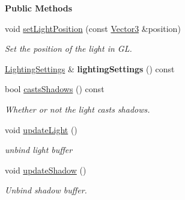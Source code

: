 \begin{Indent}\textbf{ Public Methods}\par
\begin{DoxyCompactItemize}
\item 
\mbox{\label{classrev_1_1_light_component_a3deb2d669f9bd58946af0c7efe9b61d1}} 
void \mbox{\hyperlink{classrev_1_1_light_component_a3deb2d669f9bd58946af0c7efe9b61d1}{set\+Light\+Position}} (const \mbox{\hyperlink{classrev_1_1_vector}{Vector3}} \&position)
\begin{DoxyCompactList}\small\item\em Set the position of the light in GL. \end{DoxyCompactList}\item 
\mbox{\label{classrev_1_1_light_component_a8dc576a02f274288436f8f10840ef3c2}} 
\mbox{\hyperlink{classrev_1_1_lighting_settings}{Lighting\+Settings}} \& {\bfseries lighting\+Settings} () const
\item 
\mbox{\label{classrev_1_1_light_component_a3933ce8d9e2c82e7f33f2bde7591f023}} 
bool \mbox{\hyperlink{classrev_1_1_light_component_a3933ce8d9e2c82e7f33f2bde7591f023}{casts\+Shadows}} () const
\begin{DoxyCompactList}\small\item\em Whether or not the light casts shadows. \end{DoxyCompactList}\item 
\mbox{\label{classrev_1_1_light_component_a1090a86a41982c19a05c9abdcf0930b5}} 
void \mbox{\hyperlink{classrev_1_1_light_component_a1090a86a41982c19a05c9abdcf0930b5}{update\+Light}} ()
\begin{DoxyCompactList}\small\item\em unbind light buffer \end{DoxyCompactList}\item 
\mbox{\label{classrev_1_1_light_component_a240f60f78c23be40c8c65f6152a63be1}} 
void \mbox{\hyperlink{classrev_1_1_light_component_a240f60f78c23be40c8c65f6152a63be1}{update\+Shadow}} ()
\begin{DoxyCompactList}\small\item\em Unbind shadow buffer. \end{DoxyCompactList}\item 

\end{DoxyCompactItemize}
\end{Indent}
